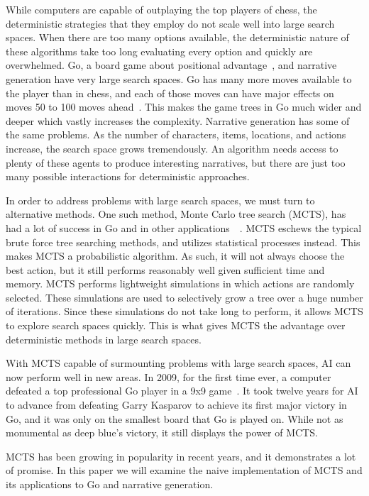 \documentclass{sig-alternate}
\begin{document}
While computers are capable of outplaying the top players of chess, the deterministic strategies that they employ do not scale well into large search spaces. When there are too many options available, the deterministic nature of these algorithms take too long evaluating every option and quickly are overwhelmed. Go, a board game about positional advantage~\cite{TheGrandChallenge}, and narrative generation have very large search spaces. Go has many more moves available to the player than in chess, and each of those moves can have major effects on moves 50 to 100 moves ahead~\cite{RAVEinGo}. This makes the game trees in Go much wider and deeper which vastly increases the complexity. Narrative generation has some of the same problems. As the number of characters, items, locations, and actions increase, the search space grows tremendously. An algorithm needs access to plenty of these agents to produce interesting narratives, but there are just too many possible interactions for deterministic approaches.

In order to address problems with large search spaces, we must turn to alternative methods. One such method, Monte Carlo tree search (MCTS), has had a lot of success in Go and in other applications~\cite{TheGrandChallenge}~\cite{ActionSelection}. MCTS eschews the typical brute force tree searching methods, and utilizes statistical processes instead. This makes MCTS a probabilistic algorithm. As such, it will not always choose the best action, but it still performs reasonably well given sufficient time and memory. MCTS performs lightweight simulations in which actions are randomly selected. These simulations are used to selectively grow a tree over a huge number of iterations. Since these simulations do not take long to perform, it allows MCTS to explore search spaces quickly. This is what gives MCTS the advantage over deterministic methods in large search spaces.

With MCTS capable of surmounting problems with large search spaces, AI can now perform well in new areas. In 2009, for the first time ever, a computer defeated a top professional Go player in a 9x9 game~\cite{TheGrandChallenge}. It took twelve years for AI to advance from defeating Garry Kasparov to achieve its first major victory in Go, and it was only on the smallest board that Go is played on. While not as monumental as deep blue's victory, it still displays the power of MCTS.

MCTS has been growing in popularity in recent years, and it demonstrates a lot of promise. In this paper we will examine the naive implementation of MCTS and its applications to Go and narrative generation.  
\end{document}
